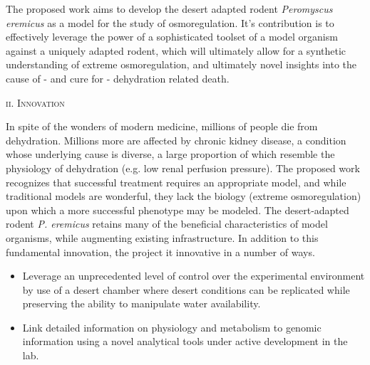 \documentclass[11pt]{article}
\begin{document}
The proposed work aims to develop the desert adapted rodent \textit{Peromyscus eremicus} as a model for the study of osmoregulation. It's contribution is to effectively leverage the power of a sophisticated toolset of a model organism against a uniquely adapted rodent, which will ultimately allow for a synthetic understanding of extreme osmoregulation, and ultimately novel insights into the cause of - and cure for - dehydration related death.

\normalsize 
\begin{center}
\textsc{{ii. Innovation}} \\
\end{center}

In spite of the wonders of modern medicine, millions of people die from dehydration. Millions more are affected by chronic kidney disease, a condition whose underlying cause is diverse, a large proportion of which resemble the physiology of dehydration (e.g. low renal perfusion pressure). The proposed work recognizes that successful treatment requires an appropriate model, and while traditional models are wonderful, they lack the biology (extreme osmoregulation) upon which a more successful phenotype may be modeled. The desert-adapted rodent \textit{P. eremicus} retains many of the beneficial characteristics of model organisms, while augmenting existing infrastructure. In addition to this fundamental innovation, the project it innovative in a number of ways.
\begin{itemize}
\item Leverage an unprecedented level of control over the experimental environment by use of a desert chamber where desert conditions can be replicated while preserving the ability to manipulate water availability. 
\item Link detailed information on physiology and metabolism to genomic information using a novel analytical tools under active development in the lab.

\end{itemize}

 

\newpage
\end{document}
